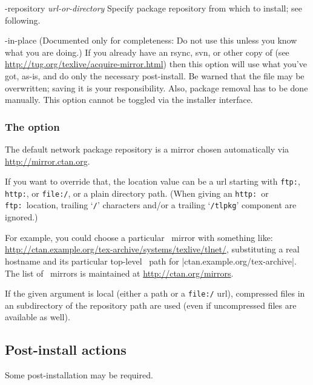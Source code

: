 \documentclass{article}
\begin{document}
\begin{ttdescription}
\item [-repository {\sl url-or-directory}] Specify package
  repository from which to install; see following.

\item[-in-place] (Documented only for completeness: Do not use this
  unless you know what you are doing.) If you already have an rsync, svn,
  or other copy of \TL{} (see
  \url{http://tug.org/texlive/acquire-mirror.html}) then this option
  will use what you've got, as-is, and do only the necessary
  post-install.  Be warned that the file 
  may be overwritten; saving it is your responsibility.  Also, package
  removal has to be done manually. This option cannot be toggled via the
  installer interface.
\end{ttdescription}


\subsubsection{The  option}
\label{sec:location}

The default network package repository is a \CTAN{} mirror chosen
automatically via \url{http://mirror.ctan.org}.

If you want to override that, the location value can be a url starting
with \texttt{ftp:}, \texttt{http:}, or \texttt{file:/}, or a plain
directory path.  (When giving an \texttt{http:}\ or \texttt{ftp:}\
location, trailing `\texttt{/}' characters and/or a trailing
`\texttt{/tlpkg}' component are ignored.)

For example, you could choose a particular \CTAN\ mirror with something
like: \url{http://ctan.example.org/tex-archive/systems/texlive/tlnet/},
substituting a real hostname and its particular top-level \CTAN\ path
for |ctan.example.org/tex-archive|.  The list of \CTAN\ mirrors is
maintained at \url{http://ctan.org/mirrors}.

If the given argument is local (either a path or a \texttt{file:/} url),
compressed files in an \dirname{archive} subdirectory of the repository
path are used (even if uncompressed files are available as well).


\subsection{Post-install actions}
\label{sec:postinstall}

Some post-installation may be required.
\end{document}
